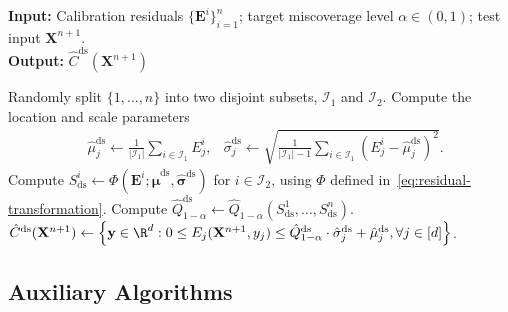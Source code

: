 \begin{algorithm}[!htb]
    \caption{Standardization with Data Splitting}
    \label{alg:std-ds}
    \textbf{Input:} Calibration residuals $\{\mathbf{E}^i\}_{i=1}^{n}$; target miscoverage level $\alpha\in(0,1)$; test input $\mathbf{X}^{n+1}$.\\
    \textbf{Output:} $\hat{C}^{\mathrm{ds}}(\mathbf{X}^{n+1})$
    \begin{algorithmic}[1]
        \State Randomly split $\{1,\ldots,n\}$ into two disjoint subsets, $\mathcal{I}_1$ and $\mathcal{I}_2$.
            \State Compute the location and scale parameters
            \begin{align*}
            & \hat{\mu}^{\mathrm{ds}}_j \gets \frac{1}{|\mathcal{I}_1|}\sum_{i \in \mathcal I_1}E^i_j,
              & \hat{\sigma}^{\mathrm{ds}}_j \gets \sqrt{\frac{1}{|\mathcal I_1|-1}\sum_{i \in \mathcal I_1}(E^i_j-\hat{\mu}^{\mathrm{ds}}_j)^2}.
            \end{align*}
        \EndFor
        \State Compute $S^i_{\mathrm{ds}} \gets \Phi(\mathbf{E}^i; \hat{\boldsymbol\mu}^{\mathrm{ds}},\hat{\boldsymbol\sigma}^{\mathrm{ds}})$ for $i \in \mathcal I_2$, using $\Phi$ defined in~\eqref{eq:residual-transformation}.
        \State Compute $\hat{Q}^\mathrm{ds}_{1-\alpha}\gets \hat{Q}_{1-\alpha}(S^1_\mathrm{ds},\dots, S^n_\mathrm{ds}).$
        \State \Return $\hat{C}^{\mathrm{ds}}(\mathbf{X}^{n+1}) \gets \left\{\mathbf y \in \R^d: 0 \leq E_j(\mathbf{X}^{n+1}, y_j) \leq \hat{Q}^\mathrm{ds}_{1-\alpha}\cdot \hat{\sigma}^\mathrm{ds}_j + \hat{\mu}^\mathrm{ds}_j, \forall j \in [d]\right\}$.
    \end{algorithmic}
\end{algorithm}

\FloatBarrier

\subsection{Auxiliary Algorithms}

